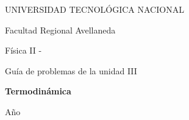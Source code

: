 \begin{titlepage}
    \begin{center}
    \vspace{1.5cm}
    

    \end{center}

    \begin{center}
        {\LARGE UNIVERSIDAD TECNOLÓGICA NACIONAL}\par\medskip
        \vspace*{0.25cm}
        {\LARGE Facultad Regional Avellaneda}\par\medskip
        \vspace*{1cm}
        {\Huge Física II - \comision}\par\medskip
        \vspace*{0.5cm}
        {\LARGE Guía de problemas de la unidad III}\par\bigskip
        \vspace*{1cm}
        {\Huge \bf \color[RGB]{0,121,138} Termodinámica\par\medskip}
    \end{center}

    \vspace{1cm}

    \begin{center}
        \begin{minipage}[t]{.7\textwidth}
            \renewcommand*{\contentsname}{Contenidos}
            \tableofcontents
        \end{minipage}
        \vspace*{\fill}
    \end{center}
    \begin{center}
        Año \anio
    \end{center}

\end{titlepage}

\newpage
{}

